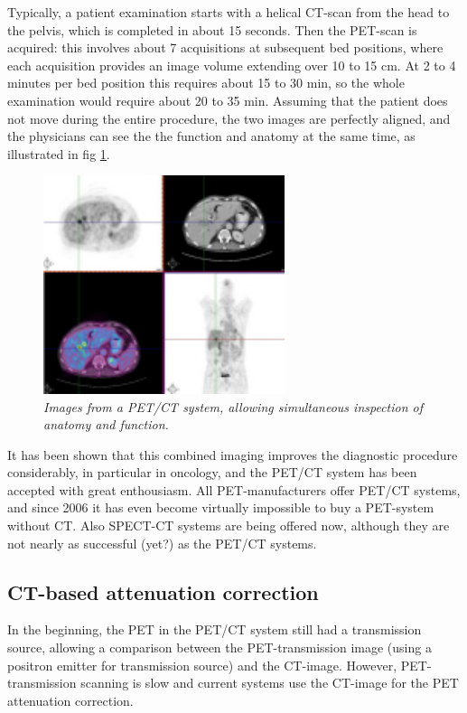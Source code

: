 Typically, a patient examination starts with a helical CT-scan from the
head to the pelvis, which is completed in about 15 seconds. Then the
PET-scan is acquired: this involves about 7 acquisitions at subsequent
bed positions, where each acquisition provides an image volume
extending over 10 to 15 cm. At 2 to 4 minutes per bed position this
requires about 15 to 30 min, so the whole examination would require
about 20 to 35 min. Assuming that the patient does not move during the
entire procedure, the two images are perfectly aligned, and the
physicians can see the the function and anatomy at the same time, as
illustrated in fig \ref{fig:petctimg}.
%
\begin{figure}[tb]
\centering
\includegraphics[width=0.63\textwidth]{figs/fig_petctimg.pdf}
\caption{\label{fig:petctimg} \emph{Images from a PET/CT system, allowing
simultaneous inspection of anatomy and function.}}
\end{figure}

It has been shown that this combined imaging improves the diagnostic
procedure considerably, in particular in oncology, and the PET/CT
system has been accepted with great enthousiasm. All PET-manufacturers
offer PET/CT systems, and since 2006 it has even become virtually
impossible to buy a PET-system without CT. Also SPECT-CT systems are
being offered now, although they are not nearly as successful (yet?)
as the PET/CT systems.

\subsection{CT-based attenuation correction}
In the beginning, the PET in the PET/CT system still had a transmission
source, allowing a comparison between the PET-transmission image (using a
positron emitter for transmission source) and the CT-image. However,
PET-transmission scanning is slow and current systems use the CT-image for the
PET attenuation correction.

